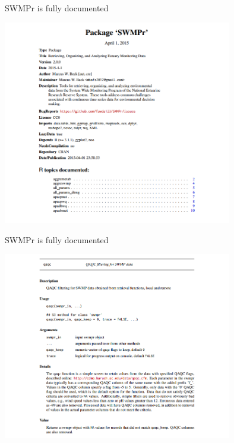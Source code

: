 \documentclass[serif]{beamer}\usepackage[]{graphicx}\usepackage[]{color}
\begin{document}
\begin{frame}[fragile]{SWMPr is fully documented}
\centerline{\includegraphics[width = 0.75\textwidth]{fig/swmpr_manual.png}}
\end{frame}

\begin{frame}[fragile]{SWMPr is fully documented}
\centerline{\includegraphics[width = 0.75\textwidth]{fig/help_ex.png}}
\end{frame}
\end{document}
